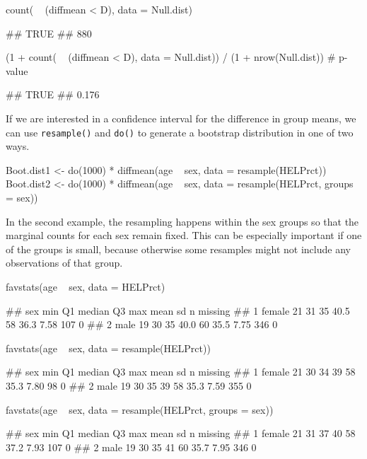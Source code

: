 \begin{Schunk}
\begin{Sinput}
count( ~ (diffmean < D), data = Null.dist)
\end{Sinput}
\begin{Soutput}
## TRUE 
##  880
\end{Soutput}
\begin{Sinput}
(1 + count( ~ (diffmean < D), data = Null.dist)) / (1 + nrow(Null.dist))  # p-value
\end{Sinput}
\begin{Soutput}
##  TRUE 
## 0.176
\end{Soutput}
\end{Schunk}

If we are interested in a confidence interval for the difference in
group means, we can use \texttt{resample()} and \texttt{do()} to
generate a bootstrap distribution in one of two ways.

\begin{Schunk}
\begin{Sinput}
Boot.dist1 <- do(1000) * diffmean(age ~ sex, data = resample(HELPrct))
Boot.dist2 <- do(1000) * diffmean(age ~ sex, data = resample(HELPrct, groups = sex))
\end{Sinput}
\end{Schunk}

\noindent
In the second example, the resampling happens within the sex groups so
that the marginal counts for each sex remain fixed. This can be
especially important if one of the groups is small, because otherwise
some resamples might not include any observations of that group.

\begin{Schunk}
\begin{Sinput}
favstats(age ~ sex, data = HELPrct)
\end{Sinput}
\begin{Soutput}
##      sex min Q1 median   Q3 max mean   sd   n missing
## 1 female  21 31     35 40.5  58 36.3 7.58 107       0
## 2   male  19 30     35 40.0  60 35.5 7.75 346       0
\end{Soutput}
\begin{Sinput}
favstats(age ~ sex, data = resample(HELPrct))
\end{Sinput}
\begin{Soutput}
##      sex min Q1 median Q3 max mean   sd   n missing
## 1 female  21 30     34 39  58 35.3 7.80  98       0
## 2   male  19 30     35 39  58 35.3 7.59 355       0
\end{Soutput}
\begin{Sinput}
favstats(age ~ sex, data = resample(HELPrct, groups = sex))
\end{Sinput}
\begin{Soutput}
##      sex min Q1 median Q3 max mean   sd   n missing
## 1 female  21 31     37 40  58 37.2 7.93 107       0
## 2   male  19 30     35 41  60 35.7 7.95 346       0
\end{Soutput}
\end{Schunk}

